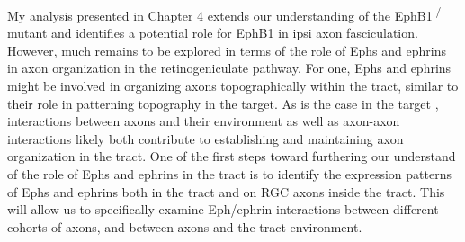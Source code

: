My analysis presented in Chapter 4 extends our understanding of the EphB1\textsuperscript{-/-} mutant and identifies a potential role for EphB1 in ipsi axon fasciculation.
However, much remains to be explored in terms of the role of Ephs and ephrins in axon organization in the retinogeniculate pathway.
For one, Ephs and ephrins might be involved in organizing axons topographically within the tract, similar to their role in patterning topography in the target.
As is the case in the target \cite{weth2014chemoaffinity}, interactions between axons and their environment as well as axon-axon interactions likely both contribute to establishing and maintaining axon organization in the tract.
One of the first steps toward furthering our understand of the role of Ephs and ephrins in the tract is to identify the expression patterns of Ephs and ephrins both in the tract and on RGC axons inside the tract.
This will allow us to specifically examine Eph/ephrin interactions between different cohorts of axons, and between axons and the tract environment.